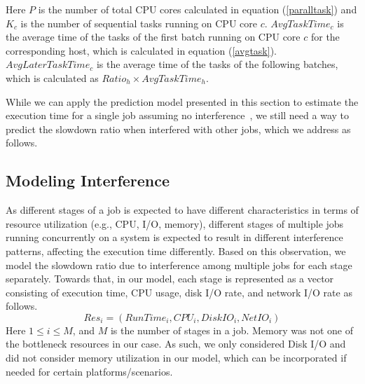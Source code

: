 \noindent
Here $P$ is the number of total CPU cores calculated in equation (\ref{paralltask}) and $K_c$ is the number of sequential tasks running on CPU core $c$. $AvgTaskTime_c$ is the average time of the tasks of the first batch running on CPU core $c$ for the corresponding host, which is calculated in equation (\ref{avgtask}). $AvgLaterTaskTime_c$ is the average time of the tasks of the following batches, which is calculated as $Ratio_h \times AvgTaskTime_h$.

\noindent
While we can apply the prediction model presented in this section to estimate the execution time for a single job assuming no interference~\cite{wangperformance}, we still need a way to predict the slowdown ratio when interfered with other jobs, which we address as follows.


\subsection{Modeling Interference}
As different stages of a job is expected to have different characteristics in terms of resource utilization (e.g., CPU, I/O, memory), different stages of multiple jobs running concurrently on a system is expected to result in different interference patterns, affecting the execution time differently. Based on this observation, we model the slowdown ratio due to interference among multiple jobs for each stage separately. Towards that, in our model, each stage is represented as a vector consisting of execution time, CPU usage, disk I/O rate, and network I/O rate as follows.
\begin{equation}
\label{res}
Res_i = (RunTime_i, CPU_i, DiskIO_i, NetIO_i)
\end{equation}
Here $1 \leq i \leq M$, and $M$ is the number of stages in a job. Memory was not one of the bottleneck resources in our case. As such, we only considered Disk I/O and did not consider memory utilization in our model, which can be incorporated if needed for certain platforms/scenarios. 





